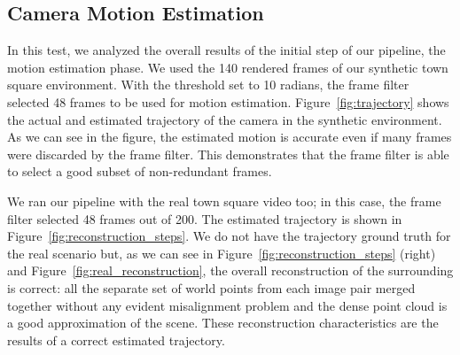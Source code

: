 \subsection{Camera Motion Estimation}
In this test, we analyzed the overall results of the initial step of our
pipeline, the motion estimation phase. We used the 140 rendered frames of our
synthetic town square environment. With the threshold set to 10 radians,
the frame filter selected 48 frames to be used for motion estimation.
Figure~\ref{fig:trajectory} shows the actual
and estimated trajectory of the camera in the synthetic environment.
As we can see in the figure, the estimated motion is accurate even if many
frames were discarded by the frame filter. This demonstrates that the frame filter is able to select a good subset of non-redundant frames.

We ran our pipeline with the real town square video too; in this case, the
frame filter selected 48 frames out of 200. The estimated trajectory is shown
in Figure~\ref{fig:reconstruction_steps}. We do not have the trajectory ground
truth for the real scenario but, as we can see in
Figure~\ref{fig:reconstruction_steps} (right) and
Figure~\ref{fig:real_reconstruction}, the overall reconstruction of the
surrounding is correct: all the separate set of world points from each
image pair merged together without any evident misalignment problem and
the dense point cloud is a good approximation of the
scene. These reconstruction characteristics are the results of a correct
estimated trajectory.
%

